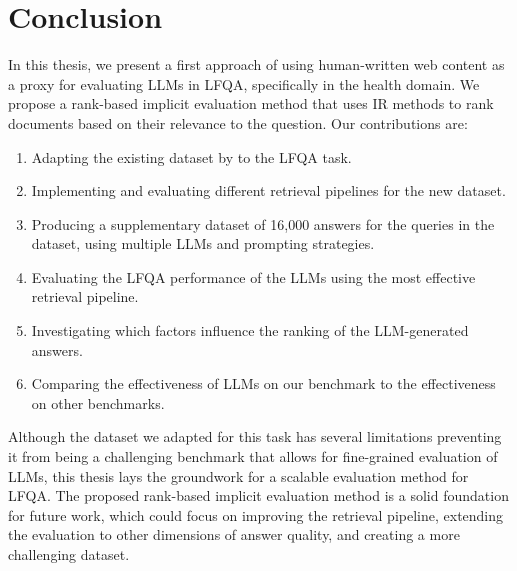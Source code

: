 \section{Conclusion}
In this thesis, we present a first approach of using human-written web content as a proxy for evaluating LLMs in LFQA, specifically in the health domain.
We propose a rank-based implicit evaluation method that uses IR methods to rank documents based on their relevance to the question.
Our contributions are:
\begin{enumerate}
    \item Adapting the existing dataset by \cite{goeuriot:2021:Consumer} to the LFQA task.
    \item Implementing and evaluating different retrieval pipelines for the new dataset.
    \item Producing a supplementary dataset of 16,000 answers for the queries in the dataset, using multiple LLMs and prompting strategies.
    \item Evaluating the LFQA performance of the LLMs using the most effective retrieval pipeline.
    \item Investigating which factors influence the ranking of the LLM-generated answers.
    \item Comparing the effectiveness of LLMs on our benchmark to the effectiveness on other benchmarks.
\end{enumerate}

Although the dataset we adapted for this task has several limitations preventing it from being a challenging benchmark that allows for fine-grained evaluation of LLMs, this thesis lays the groundwork for a scalable evaluation method for LFQA.
The proposed rank-based implicit evaluation method is a solid foundation for future work, which could focus on improving the retrieval pipeline, extending the evaluation to other dimensions of answer quality, and creating a more challenging dataset.